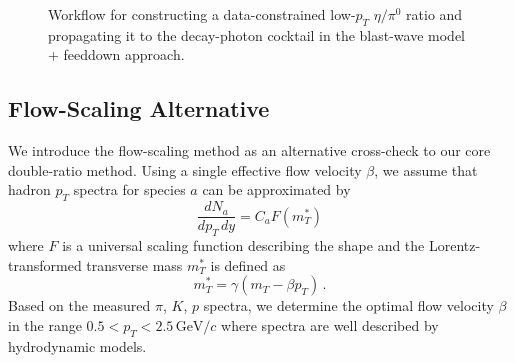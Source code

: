 \documentclass[%
 reprint,
 amsmath,amssymb,
 aps,
prc,
]{revtex4-2}
\begin{document}
\begin{figure}[t]
\centering
\begingroup
\sansmath
{}
\endgroup
\caption{Workflow for constructing a data-constrained low-$p_T$ $\eta/\pi^0$ ratio and propagating it to the decay-photon cocktail in the blast-wave model + feeddown approach.}
\label{fig:workflow}
\end{figure}

\subsection{Flow-Scaling Alternative}
We introduce the flow-scaling method as an alternative cross-check to our core double-ratio method. Using a single effective flow velocity $\beta$, we assume that hadron $p_T$ spectra for species $a$ can be approximated by
\begin{equation}
  \frac{dN_a}{dp_T\,dy} = C_a F(m_T^*)
\end{equation}
where $F$ is a universal scaling function describing the shape and the Lorentz-transformed transverse mass $m_T^*$ is defined as
\begin{equation}
  m_T^* = \gamma (m_T - \beta p_T) \,.
\end{equation}
Based on the measured $\pi$, $K$, $p$ spectra, we determine the optimal flow velocity $\beta$ in the range $0.5 < p_T < 2.5\,\mathrm{GeV}/c$ where spectra are well described by hydrodynamic models.
\end{document}

